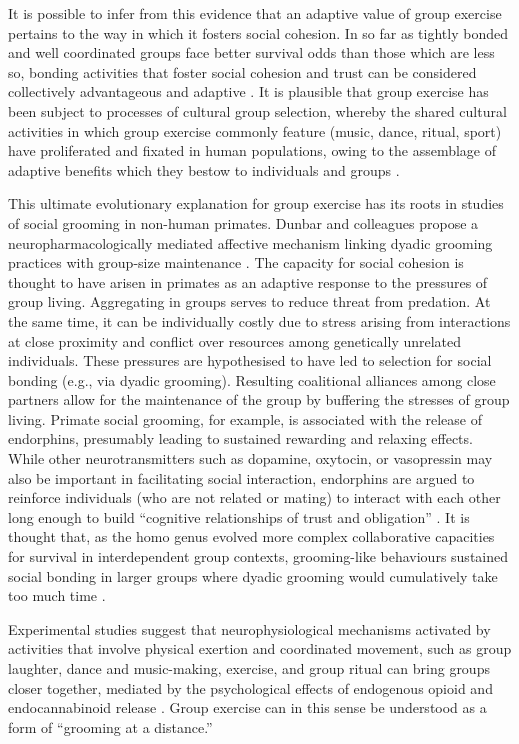 \begin{CJK}{UTF8}{gbsn}
It is possible to infer from this evidence that an adaptive value of group exercise pertains to the way in which it fosters social cohesion.  In so far as tightly bonded and well coordinated groups face better survival odds than those which are less so, bonding activities that foster social cohesion and trust can be considered collectively advantageous and adaptive \citep{Dunbar2010}.  It is plausible that group exercise has been subject to processes of cultural group selection, whereby the shared cultural activities in which group exercise commonly feature (music, dance, ritual, sport) have proliferated and fixated in human populations, owing to the assemblage of adaptive benefits which they bestow to individuals and groups \citep{Dunbar2010,Whitehouse2004,Atkinson2011a}.

This ultimate evolutionary explanation for group exercise has its roots in studies of social grooming in non-human primates. Dunbar and colleagues propose a neuropharmacologically mediated affective mechanism linking dyadic grooming practices with group-size maintenance \citep{Machin2011}.  The capacity for social cohesion is thought to have arisen in primates as an adaptive response to the pressures of group living.  Aggregating in groups serves to reduce threat from predation.  At the same time, it can be individually costly due to stress arising from interactions at close proximity and conflict over resources among genetically unrelated individuals.  These pressures are hypothesised to have led to selection for social bonding (e.g., via dyadic grooming).  Resulting coalitional alliances among close partners allow for the maintenance of the group by buffering the stresses of group living.  Primate social grooming, for example, is associated with the release of endorphins, presumably leading to sustained rewarding and relaxing effects.  While other neurotransmitters such as dopamine, oxytocin, or vasopressin may also be important in facilitating social interaction, endorphins are argued to reinforce individuals (who are not related or mating) to interact with each other long enough to build ``cognitive relationships of trust and obligation'' \citep[1839]{Dunbar2012}.  It is thought that, as the homo genus evolved more complex collaborative capacities for survival in interdependent group contexts, grooming-like behaviours sustained social bonding in larger groups where dyadic grooming would cumulatively take too much time \citep{Dunbar2012}.

Experimental studies suggest that neurophysiological mechanisms activated by activities that involve physical exertion and coordinated movement, such as group laughter, dance and music-making, exercise, and group ritual can bring groups closer together, mediated by the psychological effects of endogenous opioid and endocannabinoid release \citep{Cohen2009,Fischer2014a,Fischer2014,Sullivan2014,Tarr2016,Tarr2015}.  Group exercise can in this sense be understood as a form of ``grooming at a distance.''


\end{CJK}
